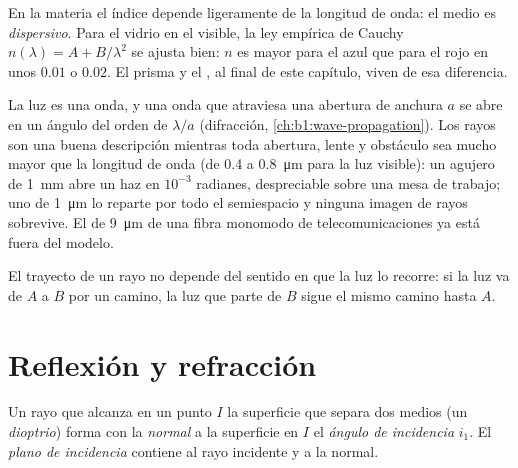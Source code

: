 \begin{remark}[Dispersión]\label{rem:b1:rays-reflection-refraction:dispersion}
En la materia el índice depende ligeramente de la longitud de onda: el
medio es \emph{dispersivo}. Para el vidrio en el visible, la ley empírica
de Cauchy $n(\lambda) = A + B/\lambda^2$ se ajusta bien: $n$ es mayor para
el azul que para el rojo en unos $0.01$ o $0.02$. El prisma y el , al final de este capítulo, viven de esa diferencia.
\end{remark}

\begin{remark}\label{rem:b1:rays-reflection-refraction:limits}
La luz es una onda, y una onda que atraviesa una abertura de anchura $a$
se abre en un ángulo del orden de $\lambda/a$ (difracción,
\cref{ch:b1:wave-propagation}). Los rayos son una buena descripción
mientras toda abertura, lente y obstáculo sea mucho mayor que la longitud
de onda (de \qty{0.4}{} a \qty{0.8}{\micro m} para la luz visible): un
agujero de \qty{1}{mm} abre un haz en $10^{-3}$ radianes, despreciable
sobre una mesa de trabajo; uno de \qty{1}{\micro m} lo reparte por todo el
semiespacio y ninguna imagen de rayos sobrevive. El  de
\qty{9}{\micro m} de una fibra monomodo de telecomunicaciones ya está
fuera del modelo.
\end{remark}

\begin{proposition}\label{prop:b1:rays-reflection-refraction:reversibility}
El trayecto de un rayo no depende del sentido en que la luz lo recorre:
si la luz va de $A$ a $B$ por un camino, la luz que parte de $B$ sigue el
mismo camino hasta $A$.
\end{proposition}
\admitted

\section{Reflexión y refracción}

\begin{definition}[Incidencia]\label{def:b1:rays-reflection-refraction:incidence}
Un rayo que alcanza en un punto $I$ la superficie que separa dos medios
(un \emph{dioptrio}) forma con la \emph{normal} a la superficie en $I$ el
\emph{ángulo de incidencia} $i_1$. El \emph{plano de incidencia} contiene
al rayo incidente y a la normal.
\end{definition}

